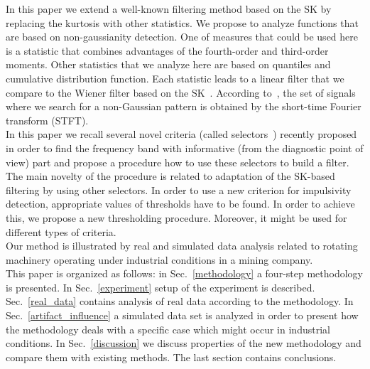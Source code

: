 \documentclass[11pt]{article} %
\begin{document}
In this paper we extend a well-known filtering method based on the SK by replacing the kurtosis with other statistics. We propose to analyze functions that are based on non-gaussianity detection. One of measures that could be used here is a statistic that combines advantages of the fourth-order and third-order moments. Other statistics that we analyze here are based on quantiles and cumulative distribution function. Each statistic leads to a linear filter that we compare to the Wiener filter based on the SK~\cite{CombetSK}. According to~\cite{CombetSK}, the set of signals where we search for a non-Gaussian pattern is obtained by the short-time Fourier transform (STFT).\\
In  this  paper we recall  several  novel  criteria (called selectors~\cite{SelectorsMSSP,bib04})  recently proposed   in  order  to  find the frequency band  with informative (from  the diagnostic point of view) part and propose a procedure how to use these selectors to build a filter. The main novelty of the procedure is related to adaptation of the SK-based filtering by using other selectors. In order to use a new criterion for impulsivity detection, appropriate values of thresholds have to be found. In order to achieve this, we propose a new thresholding procedure. Moreover, it might be used for different types of criteria.\\
Our method is illustrated by real and simulated data analysis related to rotating machinery operating under industrial conditions in a mining company.\\
This paper is organized as follows: in Sec.~\ref{methodology} a four-step methodology is presented. In Sec.~\ref{experiment} setup of the experiment is described. Sec.~\ref{real_data} contains analysis of real data according to the methodology. In Sec.~\ref{artifact_influence} a simulated data set is analyzed in order to present how the methodology deals with a specific case which might occur in industrial conditions. In Sec.~\ref{discussion} we discuss properties of the new methodology and compare them with existing methods. The last section contains conclusions.
\end{document}
